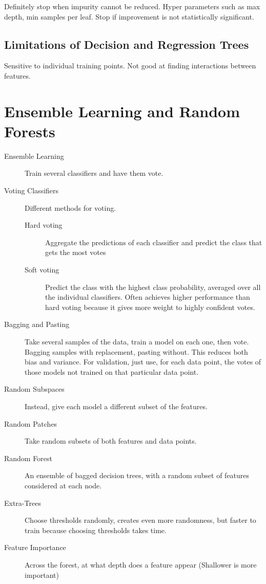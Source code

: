 \documentclass[10pt]{article}
\begin{document}
  Definitely stop when impurity cannot be reduced. Hyper parameters such as max
  depth, min samples per leaf. Stop if improvement is not statistically
  significant.

  \subsection{Limitations of Decision and Regression Trees}%
  \label{sub:limitations_of_decision_and_regression_trees}

  Sensitive to individual training points. Not good at finding interactions between
  features.

  \section{Ensemble Learning and Random Forests}%
  \label{sec:ensemble_learning_and_random_forests}

  \begin{description}
    \item[Ensemble Learning] Train several classifiers and have them vote.
    \item[Voting Classifiers] Different methods for voting.
      \begin{description}
        \item[Hard voting] Aggregate the predictions of each classifier and
          predict the class that gets the most votes
        \item[Soft voting] Predict the class with the highest class probability,
          averaged over all the individual classifiers. Often achieves higher
          performance than hard voting because it gives more weight to highly
          confident votes.
      \end{description}
    \item[Bagging and Pasting] Take several samples of the data, train a model on
      each one, then vote. Bagging samples with replacement, pasting without.
      This reduces both bias and variance. For validation, just use, for each
      data point, the votes of those models not trained on that particular data
      point.
    \item[Random Subspaces] Instead, give each model a different subset of the
      features.
    \item[Random Patches] Take random subsets of both features and data points.
    \item[Random Forest] An ensemble of bagged decision trees, with a random
      subset of features considered at each node.
    \item[Extra-Trees] Choose thresholds randomly, creates even more randomness, but
      faster to train because choosing thresholds takes time.
    \item[Feature Importance] Across the forest, at what depth does a feature
      appear (Shallower is more important)
  \end{description}
\end{document}
